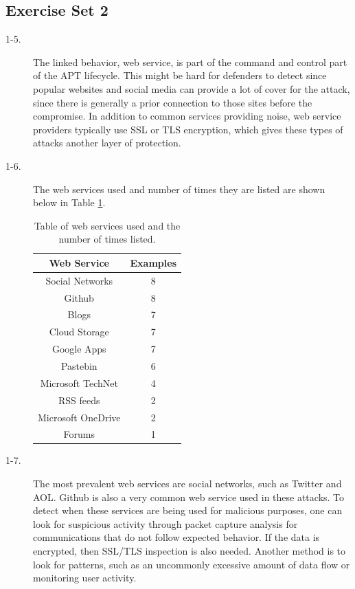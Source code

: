 \documentclass[11pt]{article}
\begin{document}
\subsection*{Exercise Set 2}
\begin{description}
  \item[1-5.] The linked behavior, web service, is part of the command and control part of the APT lifecycle. This might be
    hard for defenders to detect since popular websites and social media can provide a lot of cover for the attack, since there
    is generally a prior connection to those sites before the compromise. In addition to common services providing noise, web
    service providers typically use SSL or TLS encryption, which gives these types of attacks another layer of protection.
  \item[1-6.] The web services used and number of times they are listed are shown below in Table \ref{table:services}.
    \begin{table}[h!]
      \centering
      \begin{tabular}{ c c }
      \hline
      Web Service & Examples \\
      \hline
      Social Networks & 8 \\
      Github & 8 \\
      Blogs & 7 \\
      Cloud Storage & 7 \\
      Google Apps & 7 \\
      Pastebin & 6 \\
      Microsoft TechNet & 4 \\
      RSS feeds & 2 \\
      Microsoft OneDrive & 2 \\
      Forums & 1 \\
      \hline
      \end{tabular}
      \caption{Table of web services used and the number of times listed.}
      \label{table:services}
    \end{table}
  \item[1-7.] The most prevalent web services are social networks, such as Twitter and AOL. Github is also a very common web
    service used in these attacks. To detect when these services are being used for malicious purposes, one can look for
    suspicious activity through packet capture analysis for communications that do not follow expected behavior. If the data
    is encrypted, then SSL/TLS inspection is also needed. Another method is to look for patterns, such as an uncommonly
    excessive amount of data flow or monitoring user activity.
\end{description}
\end{document}
